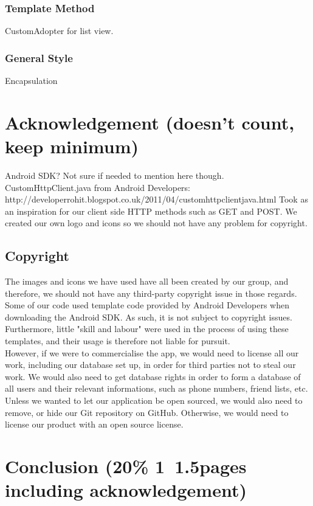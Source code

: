 \documentclass[a4paper,11pt]{article}
\begin{document}
\subsubsection*{Template Method}
CustomAdopter for list view.

\subsubsection*{General Style}
Encapsulation

 
\section{Acknowledgement (doesn’t count, keep minimum)}
Android SDK? Not sure if needed to mention here though.
CustomHttpClient.java from Android Developers: http://developerrohit.blogspot.co.uk/2011/04/customhttpclientjava.html
Took as an inspiration for our client side HTTP methods such as GET and POST.
We created our own logo and icons so we should not have any problem for copyright. 

\subsection*{Copyright}
The images and icons we have used have all been created by our group, and therefore, we should not have any third-party copyright issue in those regards.
Some of our code used template code provided by Android Developers when downloading the Android SDK. As such, it is not subject to copyright issues. Furthermore, little "skill and labour" were used in the process of using these templates, and their usage is therefore not liable for pursuit.\\
However, if we were to commercialise the app, we would need to license all our work, including our database set up, in order for third parties not to steal our work. We would also need to get database rights in order to form a database of all users and their relevant informations, such as phone numbers, friend lists, etc. \\
Unless we wanted to let our application be open sourced, we would also need to remove, or hide our Git repository on GitHub. Otherwise, we would need to license our product with an open source license.

\section*{Conclusion (20\% 1~1.5pages including acknowledgement)}
\end{document}
